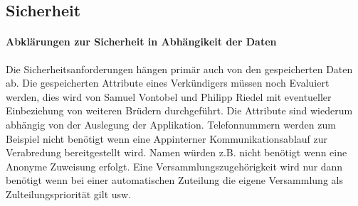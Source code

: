 
\subsection{Sicherheit}
\paragraph{Abklärungen zur Sicherheit in Abhängikeit der Daten} Die Sicherheitsanforderungen hängen primär auch von den gespeicherten Daten ab. Die gespeicherten Attribute eines Verkündigers müssen noch Evaluiert werden, dies wird von Samuel Vontobel und Philipp Riedel mit eventueller Einbeziehung von weiteren Brüdern durchgeführt. Die Attribute sind wiederum abhängig von der Auslegung der Applikation. Telefonnummern werden zum Beispiel nicht benötigt wenn eine Appinterner Kommunikationsablauf zur Verabredung bereitgestellt wird. Namen würden z.B. nicht benötigt wenn eine Anonyme Zuweisung erfolgt. Eine Versammlungszugehörigkeit wird nur dann benötigt wenn bei einer automatischen Zuteilung die eigene Versammlung als Zulteilungspriorität gilt usw. 

\newline

